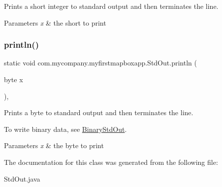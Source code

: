 Prints a short integer to standard output and then terminates the line.


\begin{DoxyParams}{Parameters}
{\em x} & the short to print \\
\hline
\end{DoxyParams}
\mbox{\label{classcom_1_1mycompany_1_1myfirstmapboxapp_1_1_std_out_a43af795c8e5a72fd5bc3c6efe20fc502}} 
\subsubsection{\texorpdfstring{println()}{println()}\hspace{0.1cm}{\footnotesize\ttfamily [10/10]}}
{\footnotesize\ttfamily static void com.\+mycompany.\+myfirstmapboxapp.\+Std\+Out.\+println (\begin{DoxyParamCaption}\item[{byte}]{x }\end{DoxyParamCaption})\hspace{0.3cm}{\ttfamily [inline]}, {\ttfamily [static]}}

Prints a byte to standard output and then terminates the line. 

To write binary data, see \hyperlink{}{Binary\+Std\+Out}.


\begin{DoxyParams}{Parameters}
{\em x} & the byte to print \\
\hline
\end{DoxyParams}


The documentation for this class was generated from the following file\+:\begin{DoxyCompactItemize}
\item 
Std\+Out.\+java\end{DoxyCompactItemize}
